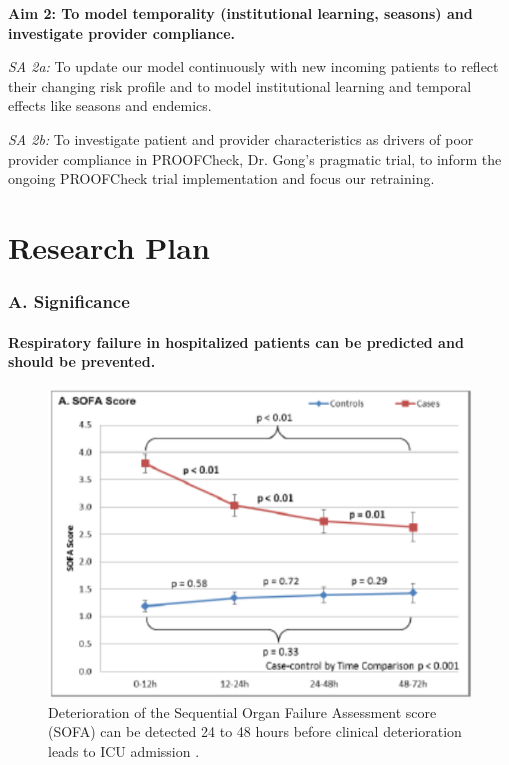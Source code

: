 \documentclass[11pt,notitlepage]{article}
\begin{document}
\vspace{-5pt}
\begin{flushleft}
\textbf{Aim 2: To model temporality (institutional learning, seasons) and investigate provider compliance.}
\end{flushleft}
\vspace{-10pt}

\textit{SA 2a:} To update our model continuously with new incoming patients to reflect their changing risk profile and to model institutional learning and temporal effects like seasons and endemics. 

\textit{SA 2b:} To investigate patient and provider characteristics as drivers of poor provider compliance in PROOFCheck, Dr. Gong's pragmatic trial, to inform the ongoing PROOFCheck trial implementation and focus our retraining. 


\part*{Research Plan}

\section*{A. Significance}

\subsection*{Respiratory failure in hospitalized patients can be predicted and should be prevented.} 

\begin{figure}
 \vspace{-70pt}
 \includegraphics[scale=0.7]{Figures/SOFA_fig.png}
  \vspace{-30pt}
  \caption{\footnotesize Deterioration of the Sequential Organ Failure Assessment score (SOFA) can be detected 24 to 48 hours before clinical deterioration leads to ICU admission \cite{Yu_24970344}.}
    \label{fig:SOFA_fig}
 \vspace{-20pt}
\end{figure}
\end{document}
